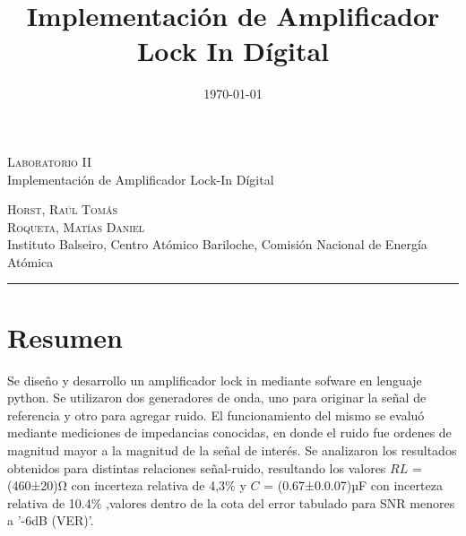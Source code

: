 \documentclass[11pt,a4paper]{extarticle}
\date{\small{\today}}
\begin{document}
\title{Implementación de Amplificador Lock In Dígital}
	\LARGE{\textsc{Laboratorio II}}\\
	\Large{Implementación de Amplificador Lock-In Dígital}\\
\begin{large}
\small\textsc{Horst, Raúl Tomás}\\
\small\textsc{Roqueta, Matías Daniel}\\
\small{Instituto Balseiro, Centro Atómico Bariloche, Comisión Nacional de Energía Atómica}\\
\end{large}
\setcounter{page}{1}

\chead{}

\rfoot{\thepage} 
\renewcommand{\headrulewidth}{0.4pt} 
\renewcommand{\footrulewidth}{0.4pt} 
\pagestyle{fancy}

\hrule
\normalsize
\section{Resumen}
Se diseño y desarrollo un amplificador lock in 
mediante sofware en lenguaje python. 
Se utilizaron dos generadores de onda, uno para originar 
la señal de referencia y otro para agregar ruido. 
El funcionamiento del mismo se evaluó mediante 
mediciones de impedancias conocidas, en donde el ruido 
fue ordenes de magnitud mayor a la magnitud de la señal 
de interés. Se analizaron los
resultados obtenidos para distintas relaciones 
señal-ruido, resultando los valores $RL$ = (460±20)Ω con 
incerteza relativa de 4,3\% y
$C$ = (0.67±0.0.07)µF con incerteza relativa de 10.4\% 
,valores dentro de la cota del error tabulado para 
SNR menores a '-6dB (VER)'.
\end{document}
